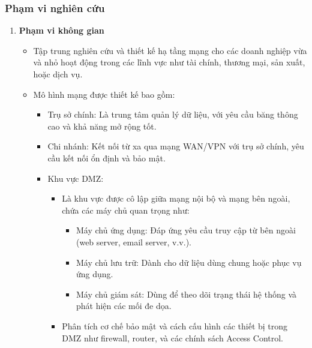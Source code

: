 \documentclass[13pt]{article}
\begin{document}
    \subsubsection{Phạm vi nghiên cứu}
\begin{enumerate}
        \item \textbf{Phạm vi không gian}
    \begin{itemize}
        \item Tập trung nghiên cứu và thiết kế hạ tầng mạng cho các doanh nghiệp vừa và nhỏ hoạt động trong các lĩnh vực như tài chính, thương mại, sản xuất, hoặc dịch vụ.
        \item Mô hình mạng được thiết kế bao gồm:
        \begin{itemize}
            \item Trụ sở chính: Là trung tâm quản lý dữ liệu, với yêu cầu băng thông cao và khả năng mở rộng tốt.
            \item Chi nhánh: Kết nối từ xa qua mạng WAN/VPN với trụ sở chính, yêu cầu kết nối ổn định và bảo mật.
            \item Khu vực DMZ:
            \begin{itemize}
                \item Là khu vực được cô lập giữa mạng nội bộ và mạng bên ngoài, chứa các máy chủ quan trọng như:
                \begin{itemize}
                    \item  Máy chủ ứng dụng: Đáp ứng yêu cầu truy cập từ bên ngoài (web server, email server, v.v.).
                    \item Máy chủ lưu trữ: Dành cho dữ liệu dùng chung hoặc phục vụ ứng dụng.
                    \item Máy chủ giám sát: Dùng để theo dõi trạng thái hệ thống và phát hiện các mối đe dọa.
                \end{itemize}
                \item Phân tích cơ chế bảo mật và cách cấu hình các thiết bị trong DMZ như firewall, router, và các chính sách Access Control.
            \end{itemize}
        \end{itemize}
    \end{itemize}


\end{enumerate}
\end{document}
